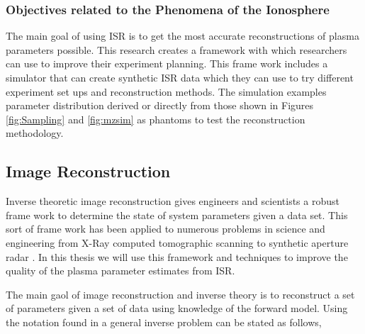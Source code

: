 %
\subsubsection{Objectives related to the Phenomena of the Ionosphere}
The main goal of using ISR is to get the most accurate reconstructions of plasma parameters possible. This research creates a framework with which researchers can use to improve their experiment planning. This frame work includes a simulator that can create synthetic ISR data which they can use to try different experiment set ups and reconstruction methods. The simulation examples parameter distribution derived or directly from those shown in Figures \ref{fig:Sampling} and \ref{fig:mzsim} as phantoms to test the reconstruction methodology.

\subsection{Image Reconstruction}
\label{sec:imgrec}
Inverse theoretic image reconstruction gives engineers and scientists a robust frame work to determine the state of system parameters given a data set. This sort of frame work has been applied to numerous problems in science and engineering from X-Ray computed tomographic scanning \cite{kak1988principles} to synthetic aperture radar \cite{1456966}. In this thesis we will use this framework and techniques to improve the quality of the plasma parameter estimates from ISR.

The main gaol of image reconstruction and inverse theory is to reconstruct a set of parameters given a set of data using knowledge of the forward model. Using the notation found in \cite{menke2012geophysical} a general inverse problem can be stated as follows,

